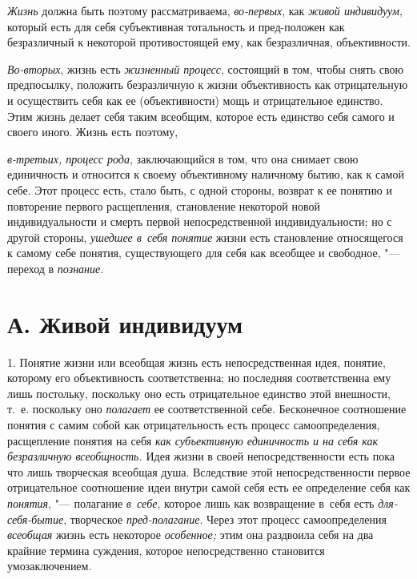 {\em Жизнь} должна быть поэтому рассматриваема, {\em во-первых}, как {\em живой
индивидуум}, который есть для себя субъективная тотальность и пред-положен как
безразличный к некоторой противостоящей ему, как безразличная, объективности.

{\em Во-вторых}, жизнь есть {\em жизненный процесс}, состоящий в том, чтобы
снять свою предпосылку, положить безразличную к жизни объективность как
отрицательную и осуществить себя как ее (объективности) мощь и отрицательное
единство. Этим жизнь делает себя таким всеобщим, которое есть единство себя
самого и своего иного. Жизнь есть поэтому,

{\em в-третьих, процесс рода}, заключающийся в том, что она снимает свою
единичность и относится к своему объективному наличному бытию, как к самой
себе. Этот процесс есть, стало быть, с одной стороны, возврат к ее понятию и
повторение первого расщепления, становление некоторой новой индивидуальности и
смерть первой непосредственной индивидуальности; но с другой стороны,
{\em ушедшее в~себя понятие} жизни есть становление относящегося к самому себе
понятия, существующего для себя как всеобщее и свободное, "--- переход
в {\em познание}.

\section[А. Живой индивидуум]{А. Живой индивидуум}

1. Понятие жизни или всеобщая жизнь есть непосредственная
идея, понятие, которому его объективность соответственна; но последняя
соответственна ему лишь постольку, поскольку оно есть отрицательное
единство этой внешности, т.~е. поскольку оно
{\em полагает} ее
соответственной себе. Бесконечное соотношение понятия с самим собой как
отрицательность есть процесс самоопределения, расщепление понятия на себя
{\em как субъективную единичность и на
себя как безразличную всеобщность.} Идея жизни в своей
непосредственности есть пока что лишь творческая всеобщая душа. Вследствие
этой непосредственности первое отрицательное соотношение идеи внутри самой
себя есть ее определение себя как {\em понятия}, "--- полагание
{\em в~себе}, которое лишь как возвращение в~себя есть {\em для-себя-бытие},
творческое {\em пред-полагание}. Через этот процесс самоопределения
{\em всеобщая} жизнь есть некоторое {\em особенное;}
этим она раздвоила себя на два крайние термина суждения,
которое непосредственно становится умозаключением.

